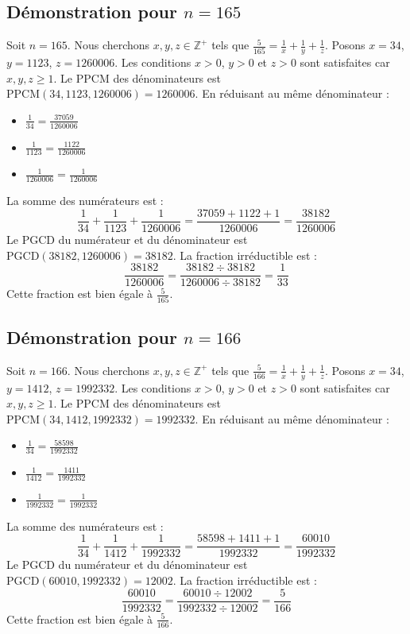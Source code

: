 \documentclass[11pt,a4paper]{article}
\begin{document}
\subsection{Démonstration pour $n = 165$}
Soit $n = 165$. Nous cherchons $x, y, z \in \mathbb{Z}^{+}$ tels que $\frac{5}{165} = \frac{1}{x} + \frac{1}{y} + \frac{1}{z}$.
Posons $x = 34$, $y = 1123$, $z = 1260006$.
Les conditions $x > 0$, $y > 0$ et $z > 0$ sont satisfaites car $x, y, z \geq 1$.
Le PPCM des dénominateurs est $\text{PPCM}(34, 1123, 1260006) = 1260006$.
En réduisant au même dénominateur :
\begin{itemize}
    \item $\frac{1}{34} = \frac{37059}{1260006}$
    \item $\frac{1}{1123} = \frac{1122}{1260006}$
    \item $\frac{1}{1260006} = \frac{1}{1260006}$
\end{itemize}
La somme des numérateurs est :
$$ \frac{1}{34} + \frac{1}{1123} + \frac{1}{1260006} = \frac{37059 + 1122 + 1}{1260006} = \frac{38182}{1260006} $$
Le PGCD du numérateur et du dénominateur est $\text{PGCD}(38182, 1260006) = 38182$.
La fraction irréductible est :
$$ \frac{38182}{1260006} = \frac{38182 \div 38182}{1260006 \div 38182} = \frac{1}{33} $$
Cette fraction est bien égale à $\frac{5}{165}$.

\subsection{Démonstration pour $n = 166$}
Soit $n = 166$. Nous cherchons $x, y, z \in \mathbb{Z}^{+}$ tels que $\frac{5}{166} = \frac{1}{x} + \frac{1}{y} + \frac{1}{z}$.
Posons $x = 34$, $y = 1412$, $z = 1992332$.
Les conditions $x > 0$, $y > 0$ et $z > 0$ sont satisfaites car $x, y, z \geq 1$.
Le PPCM des dénominateurs est $\text{PPCM}(34, 1412, 1992332) = 1992332$.
En réduisant au même dénominateur :
\begin{itemize}
    \item $\frac{1}{34} = \frac{58598}{1992332}$
    \item $\frac{1}{1412} = \frac{1411}{1992332}$
    \item $\frac{1}{1992332} = \frac{1}{1992332}$
\end{itemize}
La somme des numérateurs est :
$$ \frac{1}{34} + \frac{1}{1412} + \frac{1}{1992332} = \frac{58598 + 1411 + 1}{1992332} = \frac{60010}{1992332} $$
Le PGCD du numérateur et du dénominateur est $\text{PGCD}(60010, 1992332) = 12002$.
La fraction irréductible est :
$$ \frac{60010}{1992332} = \frac{60010 \div 12002}{1992332 \div 12002} = \frac{5}{166} $$
Cette fraction est bien égale à $\frac{5}{166}$.
\end{document}

